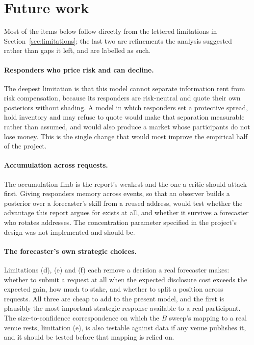 \section{Future work}

Most of the items below follow directly from the lettered limitations in
Section~\ref{sec:limitations}; the last two are refinements the analysis suggested rather
than gaps it left, and are labelled as such.

\paragraph{Responders who price risk and can decline.} The deepest limitation is that this
model cannot separate information rent from risk compensation, because its responders are
risk-neutral and quote their own posteriors without shading. A model in which responders
set a protective spread, hold inventory and may refuse to quote would make that separation measurable rather
than assumed, and would also produce a market whose participants do not lose money. This is
the single change that would most improve the empirical half of the project.

\paragraph{Accumulation across requests.} The accumulation limb is the report's weakest and
the one a critic should attack first. Giving responders memory across events, so that an
observer builds a posterior over a forecaster's skill from a reused address, would test
whether the advantage this report argues for exists at all, and whether it survives a
forecaster who rotates addresses. The concentration parameter specified in the project's
design was not implemented and should be.

\paragraph{The forecaster's own strategic choices.} Limitations (d), (e) and (f) each
remove a decision a real forecaster makes: whether to submit a request at all when the
expected disclosure cost exceeds the expected gain, how much to stake, and whether to split
a position across requests. All three are cheap to add to the present model, and the first
is plausibly the most important strategic response available to a real participant. The
size-to-confidence correspondence on which the $B$ sweep's mapping to a real venue rests,
limitation (e), is also testable against data if any venue publishes it, and it should be
tested before that mapping is relied on.

